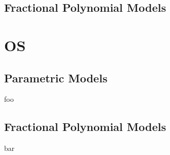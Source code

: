 \subsection{Fractional Polynomial Models}

\section{OS}
\subsection{Parametric Models}
foo

\subsection{Fractional Polynomial Models}
bar

